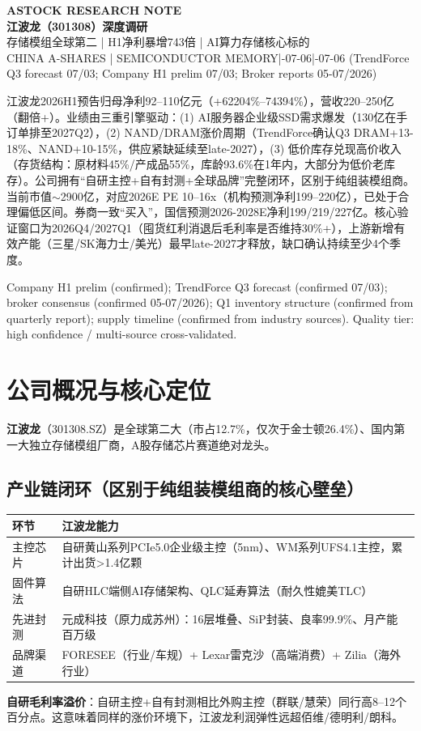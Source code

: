\documentclass[a4paper,11pt,fontset=none]{ctexart}
\newcommand{\reporttitle}{江波龙（301308）深度调研}
\newcommand{\reportsubtitle}{存储模组全球第二 | H1净利暴增743倍 | AI算力存储核心标的}
\newcommand{\reportkicker}{ASTOCK RESEARCH NOTE}
\newcommand{\reportscope}{CHINA A-SHARES | SEMICONDUCTOR MEMORY}
\newcommand{\reportdate}{2026-07-06}
\newcommand{\reportdatacutoff}{2026-07-06 (TrendForce Q3 forecast 07/03; Company H1 prelim 07/03; Broker reports 05-07/2026)}
\newcommand{\reporthouseview}{%
江波龙2026H1预告归母净利92--110亿元（+62204\%--74394\%），营收220--250亿（翻倍+）。业绩由三重引擎驱动：(1) AI服务器企业级SSD需求爆发（130亿在手订单排至2027Q2），(2) NAND/DRAM涨价周期（TrendForce确认Q3 DRAM+13-18\%、NAND+10-15\%，供应紧缺延续至late-2027），(3) 低价库存兑现高价收入（存货结构：原材料45\%/产成品55\%，库龄93.6\%在1年内，大部分为低价老库存）。公司拥有``自研主控+自有封测+全球品牌''完整闭环，区别于纯组装模组商。当前市值$\sim$2900亿，对应2026E PE 10--16x（机构预测净利199--220亿），已处于合理偏低区间。券商一致``买入''，国信预测2026-2028E净利199/219/227亿。核心验证窗口为2026Q4/2027Q1（囤货红利消退后毛利率是否维持30\%+），上游新增有效产能（三星/SK海力士/美光）最早late-2027才释放，缺口确认持续至少4个季度。%
}
\newcommand{\reportquality}{Company H1 prelim (confirmed); TrendForce Q3 forecast (confirmed 07/03); broker consensus (confirmed 05-07/2026); Q1 inventory structure (confirmed from quarterly report); supply timeline (confirmed from industry sources). Quality tier: high confidence / multi-source cross-validated.}
\begin{document}
\begin{center}
{\sffamily\small\bfseries\color{steelgrey} \reportkicker}\\[3pt]
{\LARGE\bfseries\color{navy} \reporttitle}\\[5pt]
{\large\color{steelgrey} \reportsubtitle}\\[4pt]
{\small\color{mutedgrey} \reportscope \quad|\quad \reportdate \quad|\quad \reportdatacutoff}
\end{center}
\vspace{0.7em}

\begin{dashboardbox}
\begin{houseviewbox}
\reporthouseview
\end{houseviewbox}
\begin{sourcequalitybox}
\reportquality
\end{sourcequalitybox}
\end{dashboardbox}

\section{公司概况与核心定位}

\textbf{江波龙}（301308.SZ）是全球第二大（市占12.7\%，仅次于金士顿26.4\%）、国内第一大独立存储模组厂商，A股存储芯片赛道绝对龙头。

\subsection*{产业链闭环（区别于纯组装模组商的核心壁垒）}

\begin{tabularx}{\textwidth}{L{2.5cm}X}
\toprule
\textbf{环节} & \textbf{江波龙能力} \\
\midrule
主控芯片 & 自研黄山系列PCIe5.0企业级主控（5nm）、WM系列UFS4.1主控，累计出货>1.4亿颗 \\
固件算法 & 自研HLC端侧AI存储架构、QLC延寿算法（耐久性媲美TLC） \\
先进封测 & 元成科技（原力成苏州）：16层堆叠、SiP封装、良率99.9\%、月产能百万级 \\
品牌渠道 & FORESEE（行业/车规）+ Lexar雷克沙（高端消费）+ Zilia（海外行业） \\
\bottomrule
\end{tabularx}

\textbf{自研毛利率溢价}：自研主控+自有封测相比外购主控（群联/慧荣）同行高8--12个百分点。这意味着同样的涨价环境下，江波龙利润弹性远超佰维/德明利/朗科。
\end{document}
